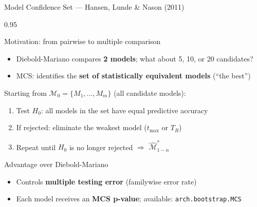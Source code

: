 \documentclass[9pt, aspectratio=169, t]{beamer}
\begin{document}
\begin{frame}{Model Confidence Set --- Hansen, Lunde \& Nason (2011)}
    \begin{cminipage}{0.95\textwidth}
    {\footnotesize
    \begin{block}{Motivation: from pairwise to multiple comparison}
        \begin{itemize}\setlength{\itemsep}{0pt}
            \item Diebold-Mariano compares \textbf{2 models}; what about 5, 10, or 20 candidates?
            \item MCS: identifies the \textbf{set of statistically equivalent models} (``the best'')
        \end{itemize}
    \end{block}
    \vspace{-1mm}
    \begin{defn}
        Starting from $\mathcal{M}_0 = \{M_1, \ldots, M_m\}$ (all candidate models):
        \begin{enumerate}\setlength{\itemsep}{-1pt}
            \item Test $H_0$: all models in the set have equal predictive accuracy
            \item If rejected: eliminate the weakest model ($t_{\max}$ or $T_R$)
            \item Repeat until $H_0$ is no longer rejected $\Rightarrow$ $\hat{\mathcal{M}}^*_{1-\alpha}$
        \end{enumerate}
    \end{defn}
    \vspace{-1mm}
    \begin{alertblock}{Advantage over Diebold-Mariano}
        \begin{itemize}\setlength{\itemsep}{-1pt}
            \item Controls \textbf{multiple testing error} (familywise error rate)
            \item Each model receives an \textbf{MCS p-value}; available: \texttt{arch.bootstrap.MCS}
        \end{itemize}
    \end{alertblock}
    }
    \end{cminipage}
\end{frame}
\end{document}
